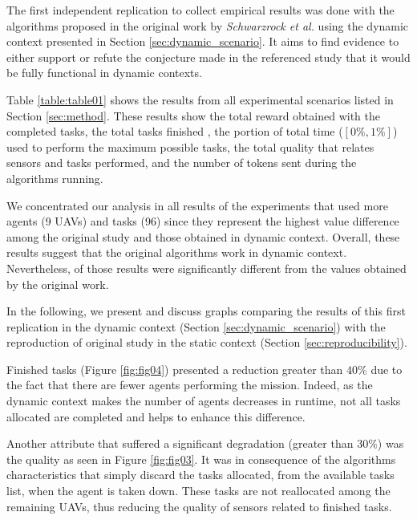 
The first independent replication to collect empirical results was done with the algorithms proposed in the original work by \textit{Schwarzrock et al.}\cite{MAS07} using the dynamic context presented in Section \ref{sec:dynamic_scenario}. It aims to find evidence to either support or refute the conjecture made in the referenced study that it would be fully functional in dynamic contexts. 

Table \ref{table:table01} shows the results from all experimental scenarios listed in Section \ref{sec:method}. These results show the total reward obtained with the completed tasks, the total tasks finished , the portion of total time ($[0\%,1\%]$) used to perform the maximum possible tasks, the total quality that relates sensors and tasks performed, and the number of tokens sent during the algorithms running. 



We concentrated our analysis in all results of the experiments that used more agents (9 UAVs) and tasks (96) since they represent the highest value difference among the original study and those obtained in dynamic context. Overall, these results suggest that the original algorithms work in dynamic context. Nevertheless, of those results were significantly different from the values obtained by the original work.

In the following, we present and discuss graphs comparing the results of this first replication in the dynamic context (Section \ref{sec:dynamic_scenario}) with the reproduction of original study in the static context (Section \ref{sec:reproducibility}).

Finished tasks (Figure \ref{fig:fig04}) presented a reduction greater than $40\%$ due to the fact that there are fewer agents performing the mission. Indeed, as the dynamic context makes the number of agents decreases in runtime, not all tasks allocated are completed and helps to enhance this difference. 

Another attribute that suffered a significant degradation (greater than $30\%$) was the quality as seen in Figure \ref{fig:fig03}. It was in consequence of the algorithms characteristics that simply discard the tasks allocated, from the available tasks list, when the agent is taken down. These tasks are not reallocated among the remaining UAVs, thus reducing the quality of sensors related to finished tasks.

